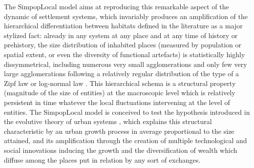 \documentclass[10pt]{article}
\begin{document}
The SimpopLocal model aims at reproducing this remarkable aspect of the dynamic of settlement systems, which invariably produces an amplification of the hierarchical differentiation between habitats defined in the literature as a major stylized fact: already in any system at any place and at any time of history or prehistory, the size distribution of inhabited places (measured by population or spatial extent, or even the diversity of functional artefacts) is statistically highly dissymmetrical, including numerous very small agglomerations and only few very large agglomerations following a relatively regular distribution of the type of a Zipf law or log-normal law \citep{fletcher1986settlement,liu1996settlement}. This hierarchical schema is a structural property (magnitude of the size of entities) at the macroscopic level which is relatively persistent in time whatever the local fluctuations intervening at the level of entities. The SimpopLocal model is conceived to test the hypothesis introduced in the evolutive theory of urban systems \citep{}, which explains this structural characteristic by an urban growth process in average proportional to the size attained, and its amplification through the creation of multiple technological and social innovations inducing the growth and the diversification of wealth which diffuse among the places put in relation by any sort of exchanges.
\end{document}
